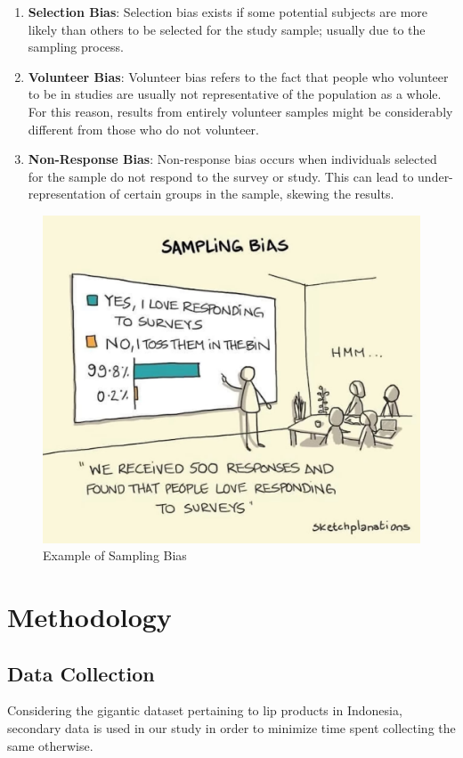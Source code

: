 \documentclass{article}
\begin{document}
\begin{enumerate}
    \item \textbf{Selection Bias}: Selection bias exists if some potential subjects are more likely than others to be selected for the study sample; usually due to the sampling process.

    \item \textbf{Volunteer Bias}: Volunteer bias refers to the fact that people who volunteer to be in studies are usually not representative of the population as a whole. For this reason, results from entirely volunteer samples might be considerably different from those who do not volunteer.

    \item \textbf{Non-Response Bias}: Non-response bias occurs when individuals selected for the sample do not respond to the survey or study. This can lead to under-representation of certain groups in the sample, skewing the results.
\end{enumerate}
\begin{figure}[htbp]
    \centering
    \includegraphics[scale = 0.25]{../images/sampling_bias_meme.jpeg}
    \caption{Example of Sampling Bias}
    \label{Sampling_Bias}
\end{figure}
\section{Methodology}
\subsection{Data Collection}
Considering the gigantic dataset pertaining to lip products in Indonesia, secondary data is used in our study in order to minimize time spent collecting the same otherwise. \\
\end{document}
